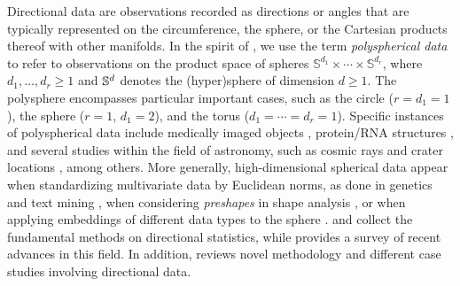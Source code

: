 \documentclass[oneside,11pt]{article}
\begin{document}
%
Directional data are observations recorded as directions or angles that are typically represented on the circumference, the sphere, or the Cartesian products thereof with other manifolds. In the spirit of \cite{Eltzner2015}, we use the term \emph{polyspherical data} to refer to observations on the product space of spheres $\mathbb{S}^{d_1}\times \cdots\times\mathbb{S}^{d_r}$, where $d_1,\ldots,d_r\geq 1$ and $\mathbb{S}^{d}$ denotes the (hyper)sphere of dimension $d\ge1$. The polysphere encompasses particular important cases, such as the circle ($r=d_1=1$), the sphere ($r=1$, $d_1=2$), and the torus ($d_1=\cdots=d_r=1$). Specific instances of polyspherical data include medically imaged objects \cite[e.g.,][]{Vuollo2016,piezer2022skeletons}, protein/RNA structures \cite[e.g.,][]{Boomsma2008,Eltzner2018}, and several studies within the field of astronomy, such as cosmic rays and crater locations \cite[e.g.,][]{Baldi2009,Garcia-Portugues2022}, among others. More generally, high-dimensional spherical data appear when standardizing multivariate data by Euclidean norms, as done in genetics \citep[e.g.,][]{Eisen1998} and text mining \citep[e.g.,][]{Banerjee2005}, when considering \emph{preshapes} in shape analysis \citep{Dryden2016}, or when applying embeddings of different data types to the sphere \citep[e.g.,][]{Li2023,Zoubouloglou2023}. \cite{Mardia1999a} and \cite{Ley2017a} collect the fundamental methods on directional statistics, while \cite{Pewsey2021} provides a survey of recent advances in this field. In addition, \cite{Marron2021} reviews novel methodology and different case studies involving directional data.
\end{document}
